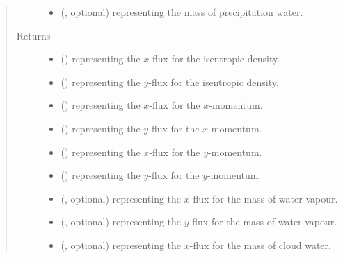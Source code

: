 \documentclass[letterpaper,10pt,english]{sphinxmanual}
\begin{document}
\begin{fulllineitems}
\begin{fulllineitems}
\begin{quote}
\begin{description}
\begin{itemize}
\item {} 
 (, optional) \textendash{}  representing the mass of precipitation water.

\end{itemize}

\item[{Returns}] \leavevmode
\begin{itemize}
\item {} 
 () \textendash{}  representing the \(x\)-flux for the isentropic density.

\item {} 
 () \textendash{}  representing the \(y\)-flux for the isentropic density.

\item {} 
 () \textendash{}  representing the \(x\)-flux for the \(x\)-momentum.

\item {} 
 () \textendash{}  representing the \(y\)-flux for the \(x\)-momentum.

\item {} 
 () \textendash{}  representing the \(x\)-flux for the \(y\)-momentum.

\item {} 
 () \textendash{}  representing the \(y\)-flux for the \(y\)-momentum.

\item {} 
 (, optional) \textendash{}  representing the \(x\)-flux for the mass of water vapour.

\item {} 
 (, optional) \textendash{}  representing the \(y\)-flux for the mass of water vapour.

\item {} 
 (, optional) \textendash{}  representing the \(x\)-flux for the mass of cloud water.


\end{itemize}
\end{description}
\end{quote}
\end{fulllineitems}
\end{fulllineitems}
\end{document}
